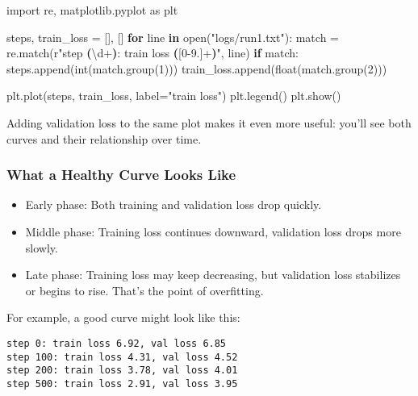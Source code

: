 \documentclass[
  letterpaper,
  DIV=11,
  numbers=noendperiod]{scrreprt}
\newenvironment{Shaded}{\begin{snugshade}}{\end{snugshade}}
\newcommand{\BuiltInTok}[1]{\textcolor[rgb]{0.00,0.23,0.31}{#1}}
\newcommand{\ControlFlowTok}[1]{\textcolor[rgb]{0.00,0.23,0.31}{\textbf{#1}}}
\newcommand{\DecValTok}[1]{\textcolor[rgb]{0.68,0.00,0.00}{#1}}
\newcommand{\ImportTok}[1]{\textcolor[rgb]{0.00,0.46,0.62}{#1}}
\newcommand{\KeywordTok}[1]{\textcolor[rgb]{0.00,0.23,0.31}{\textbf{#1}}}
\newcommand{\NormalTok}[1]{\textcolor[rgb]{0.00,0.23,0.31}{#1}}
\newcommand{\OperatorTok}[1]{\textcolor[rgb]{0.37,0.37,0.37}{#1}}
\newcommand{\PreprocessorTok}[1]{\textcolor[rgb]{0.68,0.00,0.00}{#1}}
\newcommand{\StringTok}[1]{\textcolor[rgb]{0.13,0.47,0.30}{#1}}
\newcommand{\VerbatimStringTok}[1]{\textcolor[rgb]{0.13,0.47,0.30}{#1}}
\providecommand{\tightlist}{%
  \setlength{\itemsep}{0pt}\setlength{\parskip}{0pt}}
\begin{document}
\begin{Shaded}
\begin{Highlighting}[]
\ImportTok{import}\NormalTok{ re, matplotlib.pyplot }\ImportTok{as}\NormalTok{ plt}

\NormalTok{steps, train\_loss }\OperatorTok{=}\NormalTok{ [], []}
\ControlFlowTok{for}\NormalTok{ line }\KeywordTok{in} \BuiltInTok{open}\NormalTok{(}\StringTok{"logs/run1.txt"}\NormalTok{):}
\NormalTok{    match }\OperatorTok{=}\NormalTok{ re.match(}\VerbatimStringTok{r"step }\KeywordTok{(}\DecValTok{\textbackslash{}d}\OperatorTok{+}\KeywordTok{)}\VerbatimStringTok{: train loss }\KeywordTok{(}\PreprocessorTok{[0{-}9.]}\OperatorTok{+}\KeywordTok{)}\VerbatimStringTok{"}\NormalTok{, line)}
    \ControlFlowTok{if}\NormalTok{ match:}
\NormalTok{        steps.append(}\BuiltInTok{int}\NormalTok{(match.group(}\DecValTok{1}\NormalTok{)))}
\NormalTok{        train\_loss.append(}\BuiltInTok{float}\NormalTok{(match.group(}\DecValTok{2}\NormalTok{)))}

\NormalTok{plt.plot(steps, train\_loss, label}\OperatorTok{=}\StringTok{"train loss"}\NormalTok{)}
\NormalTok{plt.legend()}
\NormalTok{plt.show()}
\end{Highlighting}
\end{Shaded}

Adding validation loss to the same plot makes it even more useful:
you'll see both curves and their relationship over time.

\subsubsection{What a Healthy Curve Looks
Like}\label{what-a-healthy-curve-looks-like}

\begin{itemize}
\tightlist
\item
  Early phase: Both training and validation loss drop quickly.
\item
  Middle phase: Training loss continues downward, validation loss drops
  more slowly.
\item
  Late phase: Training loss may keep decreasing, but validation loss
  stabilizes or begins to rise. That's the point of overfitting.
\end{itemize}

For example, a good curve might look like this:

\begin{verbatim}
step 0: train loss 6.92, val loss 6.85
step 100: train loss 4.31, val loss 4.52
step 200: train loss 3.78, val loss 4.01
step 500: train loss 2.91, val loss 3.95
\end{verbatim}
\end{document}

